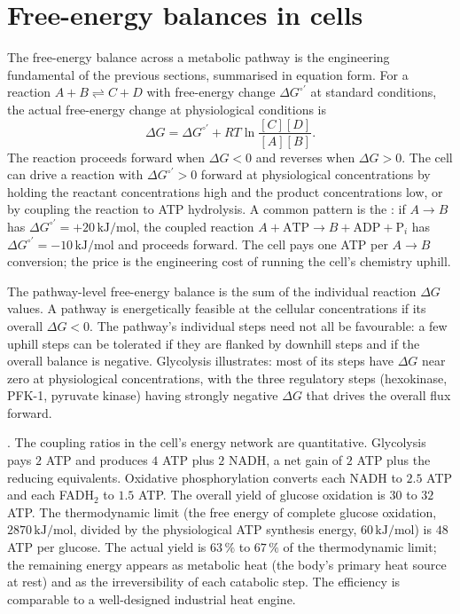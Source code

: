 \section{Free-energy balances in cells}

The free-energy balance across a metabolic pathway is the engineering
fundamental of the previous sections, summarised in equation form.
For a reaction $A + B \rightleftharpoons C + D$ with free-energy
change $\Delta G^{\circ\prime}$ at standard conditions, the actual
free-energy change at physiological conditions is
\[
\Delta G = \Delta G^{\circ\prime} + RT \ln \frac{[C][D]}{[A][B]}.
\]
The reaction proceeds forward when $\Delta G < 0$ and reverses when
$\Delta G > 0$. The cell can drive a reaction with $\Delta G^{\circ\prime}
> 0$ forward at physiological concentrations by holding the reactant
concentrations high and the product concentrations low, or by coupling
the reaction to ATP hydrolysis. A common pattern is the
: if
$A \rightarrow B$ has $\Delta G^{\circ\prime} = +20\,\text{kJ}/\text{mol}$,
the coupled reaction $A + \text{ATP} \rightarrow B + \text{ADP} +
\text{P}_i$ has $\Delta G^{\circ\prime} = -10\,\text{kJ}/\text{mol}$ and
proceeds forward. The cell pays one ATP per $A \rightarrow B$
conversion; the price is the engineering cost of running the cell's
chemistry uphill.

The pathway-level free-energy balance is the sum of the individual
reaction $\Delta G$ values. A pathway is energetically feasible at the
cellular concentrations if its overall $\Delta G < 0$. The pathway's
individual steps need not all be favourable: a few uphill steps can
be tolerated if they are flanked by downhill steps and if the overall
balance is negative. Glycolysis illustrates: most of its steps have
$\Delta G$ near zero at physiological concentrations, with the three
regulatory steps (hexokinase, PFK-1, pyruvate kinase) having
strongly negative $\Delta G$ that drives the overall flux forward.

. The coupling ratios in the cell's energy
network are quantitative. Glycolysis pays $2$ ATP and produces
$4$ ATP plus $2$ NADH, a net gain of $2$ ATP plus the reducing
equivalents. Oxidative phosphorylation converts each NADH to $2.5$
ATP and each FADH$_2$ to $1.5$ ATP. The overall yield of glucose
oxidation is $30$ to $32$ ATP. The thermodynamic limit (the free
energy of complete glucose oxidation, $2870\,\text{kJ}/\text{mol}$,
divided by the physiological ATP synthesis energy,
$60\,\text{kJ}/\text{mol}$) is $48$ ATP per glucose. The actual yield
is $63\,\%$ to $67\,\%$ of the thermodynamic limit; the remaining
energy appears as metabolic heat (the body's primary heat source at
rest) and as the irreversibility of each catabolic step. The
efficiency is comparable to a well-designed industrial heat engine.

